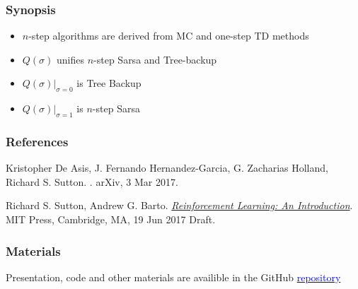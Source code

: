 \documentclass{beamer}
\begin{document}
\begin{frame}
  \frametitle{Synopsis}
  \begin{itemize}
    \item $n$-step algorithms are derived from MC and one-step TD methods
    \item $Q(\sigma)$ unifies $n$-step Sarsa and Tree-backup
    \item $Q(\sigma)|_{\sigma=0}$ is Tree Backup
    \item $Q(\sigma)|_{\sigma=1}$ is $n$-step Sarsa
  \end{itemize}
\end{frame}

\begin{frame}
  \frametitle<presentation>{References}

  \begin{thebibliography}{10}

  \beamertemplatebookbibitems

  \beamertemplatearticlebibitems

    Kristopher De Asis, J. Fernando Hernandez-Garcia, G. Zacharias Holland,
    Richard S. Sutton.
    .
    \newblock arXiv, 3 Mar 2017.

   Richard S. Sutton, Andrew G. Barto.
    \newblock
    {\href{http://incompleteideas.net/sutton/book/the-book-2nd.html}{\em
      Reinforcement Learning: An Introduction}}.
    \newblock MIT Press, Cambridge, MA, 19 Jun 2017 Draft.

  \end{thebibliography}
\end{frame}


\begin{frame}
  \frametitle{Materials}
  \begin{center}
  Presentation, code and other materials are availible in the GitHub
  \href{https://github.com/omtcyfz/talks/tree/master/n-step-q-sigma}{
    \textcolor{blue}{repository}}
  \end{center}
\end{frame}

\end{document}
